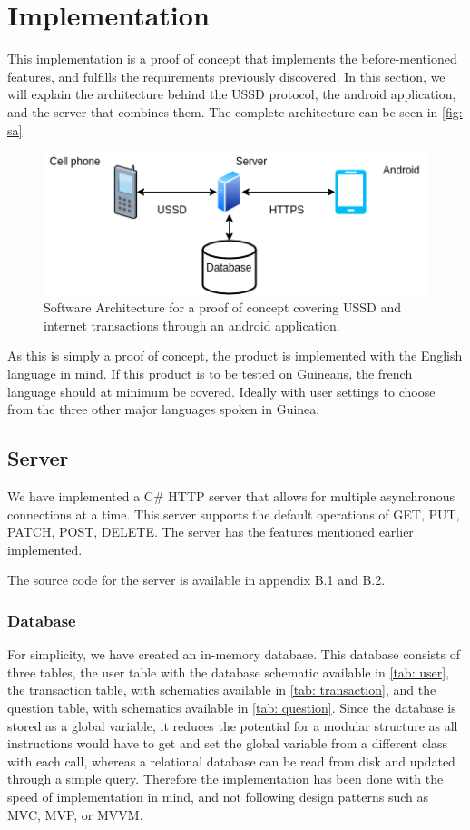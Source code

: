 \documentclass[11pt, a4paper]{article}
\begin{document}

\section{Implementation}
This implementation is a proof of concept that implements the before-mentioned features, and fulfills the requirements previously discovered. In this section, we will explain the architecture behind the USSD protocol, the android application, and the server that combines them. The complete architecture can be seen in \autoref{fig: sa}.

\begin{figure}[ht]
\centering
\includegraphics[width=1\linewidth]{figs/SA2.png}
\caption{Software Architecture for a proof of concept covering USSD and internet transactions through an android application.}
\label{fig: sa}
\end{figure}

As this is simply a proof of concept, the product is implemented with the English language in mind. If this product is to be tested on Guineans, the french language should at minimum be covered. Ideally with user settings to choose from the three other major languages spoken in Guinea.
\subsection{Server} %
We have implemented a C\# HTTP server that allows for multiple asynchronous connections at a time. This server supports the default operations of GET, PUT, PATCH, POST, DELETE. The server has the features mentioned earlier implemented.

The source code for the server is available in appendix B.1 and B.2.

\subsubsection{Database}
For simplicity, we have created an in-memory database. This database consists of three tables, the user table with the database schematic available in \autoref{tab: user}, the transaction table, with schematics available in \autoref{tab: transaction}, and the question table, with schematics available in \autoref{tab: question}. Since the database is stored as a global variable, it reduces the potential for a modular structure as all instructions would have to get and set the global variable from a different class with each call, whereas a relational database can be read from disk and updated through a simple query. Therefore the implementation has been done with the speed of implementation in mind, and not following design patterns such as MVC, MVP, or MVVM.
\end{document}

